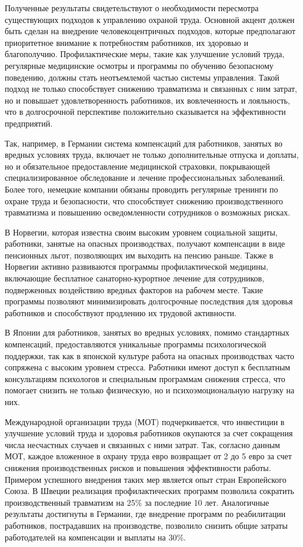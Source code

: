 Полученные результаты свидетельствуют о необходимости пересмотра
существующих подходов к управлению охраной труда. Основной акцент должен
быть сделан на внедрение человекоцентричных подходов, которые
предполагают приоритетное внимание к потребностям работников, их
здоровью и благополучию. Профилактические меры, такие как улучшение
условий труда, регулярные медицинские осмотры и программы по обучению
безопасному поведению, должны стать неотъемлемой частью системы
управления. Такой подход не только способствует снижению травматизма и
связанных с ним затрат, но и повышает удовлетворенность работников, их
вовлеченность и лояльность, что в долгосрочной перспективе положительно
сказывается на эффективности предприятий.

Так, например, в Германии система компенсаций для работников, занятых во
вредных условиях труда, включает не только дополнительные отпуска и
доплаты, но и обязательное предоставление медицинской страховки,
покрывающей специализированное обследование и лечение профессиональных
заболеваний. Более того, немецкие компании обязаны проводить регулярные
тренинги по охране труда и безопасности, что способствует снижению
производственного травматизма и повышению осведомленности сотрудников о
возможных рисках.

В Норвегии, которая известна своим высоким уровнем социальной защиты,
работники, занятые на опасных производствах, получают компенсации в виде
пенсионных льгот, позволяющих им выходить на пенсию раньше. Также в
Норвегии активно развиваются программы профилактической медицины,
включающие бесплатное санаторно-курортное лечение для сотрудников,
подверженных воздействию вредных факторов на рабочем месте. Такие
программы позволяют минимизировать долгосрочные последствия для здоровья
работников и способствуют продлению их трудовой активности.

В Японии для работников, занятых во вредных условиях, помимо стандартных
компенсаций, предоставляются уникальные программы психологической
поддержки, так как в японской культуре работа на опасных производствах
часто сопряжена с высоким уровнем стресса. Работники имеют доступ к
бесплатным консультациям психологов и специальным программам снижения
стресса, что помогает снизить не только физическую, но и
психоэмоциональную нагрузку на них.

Международной организации труда (МОТ) подчеркивается, что инвестиции в
улучшение условий труда и здоровья работников окупаются за счет
сокращения числа несчастных случаев и связанных с ними затрат. Так,
согласно данным МОТ, каждое вложенное в охрану труда евро возвращает от
2 до 5 евро за счет снижения производственных рисков и повышения
эффективности работы\hspace{0pt}\hspace{0pt}. Примером успешного
внедрения таких мер является опыт стран Европейского Союза. В Швеции
реализация профилактических программ позволила сократить
производственный травматизм на 25\% за последние 10 лет. Аналогичные
результаты достигнуты в Германии, где внедрение программ по реабилитации
работников, пострадавших на производстве, позволило снизить общие
затраты работодателей на компенсации и выплаты на
30\%\hspace{0pt}\hspace{0pt}.

